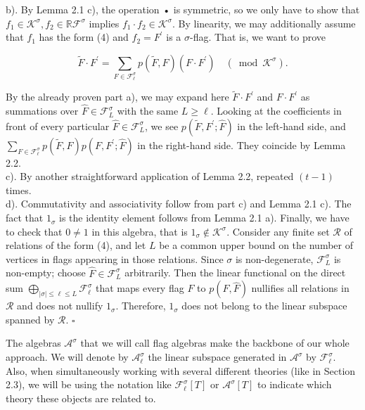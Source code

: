\documentclass[10pt]{article}
\begin{document}
b). By Lemma 2.1 c), the operation • is symmetric, so we only have to show that $f_{1} \in \mathcal{K}^{\sigma}, f_{2} \in \mathbb{R} \mathcal{F}^{\sigma}$ implies $f_{1} \cdot f_{2} \in \mathcal{K}^{\sigma}$. By linearity, we may additionally assume that $f_{1}$ has the form (4) and $f_{2}=F^{\prime}$ is a $\sigma$-flag. That is, we want to prove

$$
\widetilde{F} \cdot F^{\prime}=\sum_{F \in \mathcal{F}_{\ell}^{\sigma}} p(\widetilde{F}, F)\left(F \cdot F^{\prime}\right) \quad\left(\bmod \mathcal{K}^{\sigma}\right) .
$$

By the already proven part a), we may expand here $\widetilde{F} \cdot F^{\prime}$ and $F \cdot F^{\prime}$ as summations over $\widehat{F} \in \mathcal{F}_{L}^{\sigma}$ with the same $L \geq \ell$. Looking at the coefficients in front of every particular $\widehat{F} \in \mathcal{F}_{L}^{\sigma}$, we see $p\left(\widetilde{F}, F^{\prime} ; \widehat{F}\right)$ in the left-hand side, and $\sum_{F \in \mathcal{F}_{\ell}^{\sigma}} p(\widetilde{F}, F) p\left(F, F^{\prime} ; \widehat{F}\right)$ in the right-hand side. They coincide by Lemma 2.2.\\
c). By another straightforward application of Lemma 2.2, repeated $(t-1)$ times.\\
d). Commutativity and associativity follow from part c) and Lemma 2.1 c). The fact that $1_{\sigma}$ is the identity element follows from Lemma 2.1 a). Finally, we have to check that $0 \neq 1$ in this algebra, that is $1_{\sigma} \notin \mathcal{K}^{\sigma}$. Consider any finite set $\mathcal{R}$ of relations of the form (4), and let $L$ be a common upper bound on the number of vertices in flags appearing in those relations. Since $\sigma$ is non-degenerate, $\mathcal{F}_{L}^{\sigma}$ is non-empty; choose $\widehat{F} \in \mathcal{F}_{L}^{\sigma}$ arbitrarily. Then the linear functional on the direct sum $\bigoplus_{|\sigma| \leq \ell \leq L} \mathcal{F}_{\ell}^{\sigma}$ that maps every flag $F$ to $p(F, \widehat{F})$ nullifies all relations in $\mathcal{R}$ and does not nullify $1_{\sigma}$. Therefore, $1_{\sigma}$ does not belong to the linear subspace spanned by $\mathcal{R}$. \(\square\)

The algebras $\mathcal{A}^{\sigma}$ that we will call flag algebras make the backbone of our whole approach. We will denote by $\mathcal{A}_{\ell}^{\sigma}$ the linear subspace generated in $\mathcal{A}^{\sigma}$ by $\mathcal{F}_{\ell}^{\sigma}$. Also, when simultaneously working with several different theories (like in Section 2.3), we will be using the notation like $\mathcal{F}_{\ell}^{\sigma}[T]$ or $\mathcal{A}^{\sigma}[T]$ to indicate which theory these objects are related to.
\end{document}
